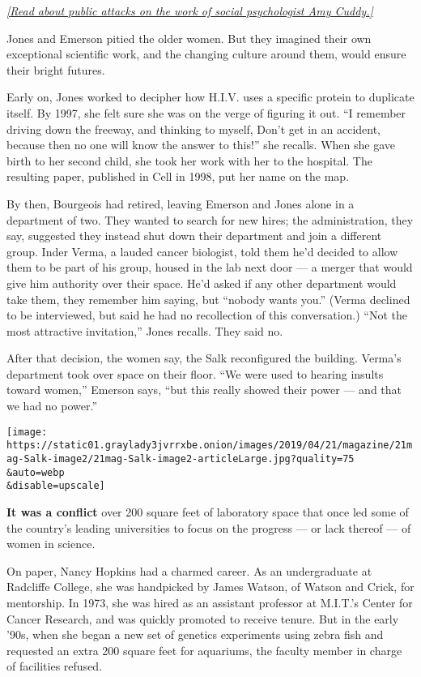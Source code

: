\href{https://www.nytimes3xbfgragh.onion/2017/10/18/magazine/when-the-revolution-came-for-amy-cuddy.html}{\emph{{[}Read
about public attacks on the work of social psychologist Amy Cuddy.{]}}}

Jones and Emerson pitied the older women. But they imagined their own
exceptional scientific work, and the changing culture around them, would
ensure their bright futures.

Early on, Jones worked to decipher how H.I.V. uses a specific protein to
duplicate itself. By 1997, she felt sure she was on the verge of
figuring it out. ``I remember driving down the freeway, and thinking to
myself, Don't get in an accident, because then no one will know the
answer to this!'' she recalls. When she gave birth to her second child,
she took her work with her to the hospital. The resulting paper,
published in Cell in 1998, put her name on the map.

By then, Bourgeois had retired, leaving Emerson and Jones alone in a
department of two. They wanted to search for new hires; the
administration, they say, suggested they instead shut down their
department and join a different group. Inder Verma, a lauded cancer
biologist, told them he'd decided to allow them to be part of his group,
housed in the lab next door --- a merger that would give him authority
over their space. He'd asked if any other department would take them,
they remember him saying, but ``nobody wants you.'' (Verma declined to
be interviewed, but said he had no recollection of this conversation.)
``Not the most attractive invitation,'' Jones recalls. They said no.

After that decision, the women say, the Salk reconfigured the building.
Verma's department took over space on their floor. ``We were used to
hearing insults toward women,'' Emerson says, ``but this really showed
their power --- and that we had no power.''

\texttt{[image: https://static01.graylady3jvrrxbe.onion/images/2019/04/21/magazine/21mag-Salk-image2/21mag-Salk-image2-articleLarge.jpg?quality=75\\\&auto=webp\\\&disable=upscale]}

\textbf{It was a conflict} over 200 square feet of laboratory space that
once led some of the country's leading universities to focus on the
progress --- or lack thereof --- of women in science.

On paper, Nancy Hopkins had a charmed career. As an undergraduate at
Radcliffe College, she was handpicked by James Watson, of Watson and
Crick, for mentorship. In 1973, she was hired as an assistant professor
at M.I.T.'s Center for Cancer Research, and was quickly promoted to
receive tenure. But in the early '90s, when she began a new set of
genetics experiments using zebra fish and requested an extra 200 square
feet for aquariums, the faculty member in charge of facilities refused.

